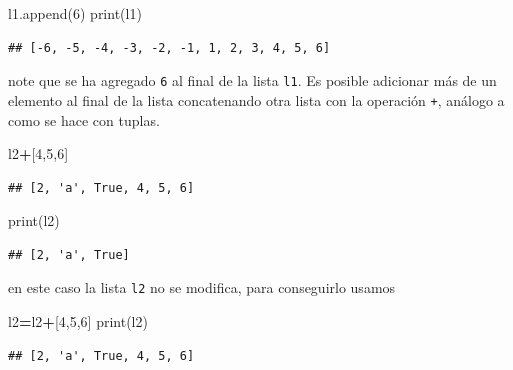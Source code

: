 \documentclass[
]{book}
\newenvironment{Shaded}{\begin{snugshade}}{\end{snugshade}}
\newcommand{\BuiltInTok}[1]{#1}
\newcommand{\DecValTok}[1]{\textcolor[rgb]{0.00,0.00,0.81}{#1}}
\newcommand{\NormalTok}[1]{#1}
\newcommand{\OperatorTok}[1]{\textcolor[rgb]{0.81,0.36,0.00}{\textbf{#1}}}
\theoremstyle{definition}
\theoremstyle{definition}
\theoremstyle{definition}
\theoremstyle{definition}
\theoremstyle{remark}
\begin{document}
\begin{Shaded}
\begin{Highlighting}[]
\NormalTok{l1.append(}\DecValTok{6}\NormalTok{) }
\BuiltInTok{print}\NormalTok{(l1)}
\end{Highlighting}
\end{Shaded}

\begin{verbatim}
## [-6, -5, -4, -3, -2, -1, 1, 2, 3, 4, 5, 6]
\end{verbatim}

note que se ha agregado \texttt{6} al final de la lista \texttt{l1}. Es posible adicionar más de un elemento al final de la lista concatenando otra lista con la operación \texttt{+}, análogo a como se hace con tuplas.

\begin{Shaded}
\begin{Highlighting}[]
\NormalTok{l2}\OperatorTok{+}\NormalTok{[}\DecValTok{4}\NormalTok{,}\DecValTok{5}\NormalTok{,}\DecValTok{6}\NormalTok{]  }
\end{Highlighting}
\end{Shaded}

\begin{verbatim}
## [2, 'a', True, 4, 5, 6]
\end{verbatim}

\begin{Shaded}
\begin{Highlighting}[]
\BuiltInTok{print}\NormalTok{(l2)}
\end{Highlighting}
\end{Shaded}

\begin{verbatim}
## [2, 'a', True]
\end{verbatim}

en este caso la lista \texttt{l2} no se modifica, para conseguirlo usamos

\begin{Shaded}
\begin{Highlighting}[]
\NormalTok{l2}\OperatorTok{=}\NormalTok{l2}\OperatorTok{+}\NormalTok{[}\DecValTok{4}\NormalTok{,}\DecValTok{5}\NormalTok{,}\DecValTok{6}\NormalTok{]  }
\BuiltInTok{print}\NormalTok{(l2)}
\end{Highlighting}
\end{Shaded}

\begin{verbatim}
## [2, 'a', True, 4, 5, 6]
\end{verbatim}
\end{document}
